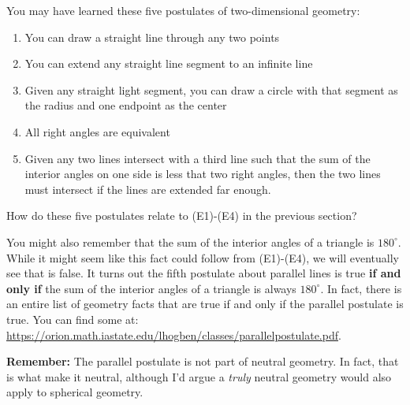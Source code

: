 \documentclass[instructornotes]{ximera}
\begin{document}
You may have learned these five postulates of two-dimensional geometry:
\begin{enumerate}
\item You can draw a straight line through any two points
\item You can extend any straight line segment to an infinite line
\item Given any straight light segment, you can draw a circle with that segment as the radius and one endpoint as the center
\item All right angles are equivalent
\item Given any two lines intersect with a third line such that the sum of the interior angles on one side is less that two right angles, then the two lines must intersect if the lines are extended far enough.
\end{enumerate}

How do these five postulates relate to (E1)-(E4) in the previous section?

You might also remember that the sum of the interior angles of a triangle is $180^\circ$. While it might seem like this fact could follow from (E1)-(E4), we will eventually see that is false. It turns out the fifth postulate about parallel lines is true {\bf if and only if} the sum of the interior angles of a triangle is always $180^\circ$. In fact, there is an entire list of geometry facts that are true if and only if the parallel postulate is true. You can find some at: \url{https://orion.math.iastate.edu/lhogben/classes/parallelpostulate.pdf}. 

{\bf Remember:} The parallel postulate is not part of neutral geometry. In fact, that is what make it neutral, although I'd argue a \emph{truly} neutral geometry would also apply to spherical geometry.
\end{document}
